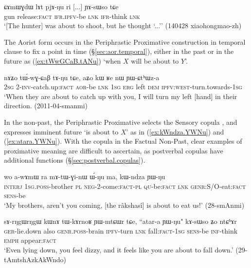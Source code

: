   \begin{exe} 
\ex \label{ex:lAt.pjANu}
\gll  ɕɤmɯɣdɯ lɤt pjɤ-ŋu ri [...] ɲɤ-sɯso tɕe \\
gun release:\textsc{fact} \textsc{ifr}.\textsc{ipfv}-be \textsc{lnk} { } \textsc{ifr}-think \textsc{lnk} \\
\glt `[The hunter] was about to shoot, but he thought `...'' (140428 xiaohongmao-zh) 
 \end{exe}
 
The Aorist form  occurs in the Periphrastic Proximative construction in temporal clause to fix a point in time (§\ref{sec:aor.temporal}), either in the past or in the future as (\ref{ex:tWwGCaB.tANu}) `when $X$ will be about to $Y$'.

\begin{exe} 
\ex \label{ex:tWwGCaB.tANu}
\gll  nɤʑo tɯ́-wɣ-ɕaβ tɤ-ŋu tɕe, aʑo kɯ ʁe nɯ ɲɯ-ɕtʰɯz-a \\
\textsc{2sg} 2-\textsc{inv}-catch.up:\textsc{fact} \textsc{aor}-be \textsc{lnk} \textsc{1sg} \textsc{erg} left \textsc{dem} \textsc{ipfv}:\textsc{west}-turn.towards-\textsc{1sg} \\ 
\glt `When they are about to catch up with you, I will turn my left [hand] in their direction. (2011-04-smanmi)
 \end{exe}
 
In the non-past, the Periphrastic Proximative selects the Sensory copula , and expresses imminent future `is about to $X$' as in (\ref{ex:kWndza.YWNu}) and (\ref{ex:atara.YWNu}). With the copula in the Factual Non-Past, clear examples of proximative meaning are difficult to ascertain, as postverbal copulas have additional functions (§\ref{sec:postverbal.copulas}).

 \begin{exe} 
\ex \label{ex:kWndza.YWNu}
\gll  wo a-wɤmɯ ra mɤ-tɯ-ɣi-nɯ ɯ́-ŋu ma, kɯ-ndza ɲɯ-ŋu \\
\textsc{interj} \textsc{1sg}.\textsc{poss}-brother \textsc{pl} \textsc{neg}-2-come:\textsc{fact}-\textsc{pl} \textsc{qu}-be:\textsc{fact} \textsc{lnk} \textsc{genr}:S/O-eat:\textsc{fact} \textsc{sens}-be \\
\glt `My brothers, aren't you coming, [the râkshasî] is about to eat us!' (28-smAnmi)
 \end{exe}

 \begin{exe} 
\ex \label{ex:atara.YWNu}
\gll sɤ-rŋgɯ\redp{}rŋgɯ kɯnɤ tɯ-kɤrnoʁ ɲɯ-mtɕɯr tɕe, ``atar-a ɲɯ-ŋu" kɤ-sɯso ʑo ntɕʰɤr \\
\textsc{ger}-lie.down also \textsc{genr}.\textsc{poss}-brain \textsc{ipfv}-turn \textsc{lnk} fall:\textsc{fact}-\textsc{1sg} \textsc{sens}-be \textsc{inf}-think \textsc{emph} appear:\textsc{fact} \\
\glt `Even lying down, you feel dizzy, and it feels like you are about to fall down.' (29-tAmtshAzkAkWndo) 
 \end{exe}
 

